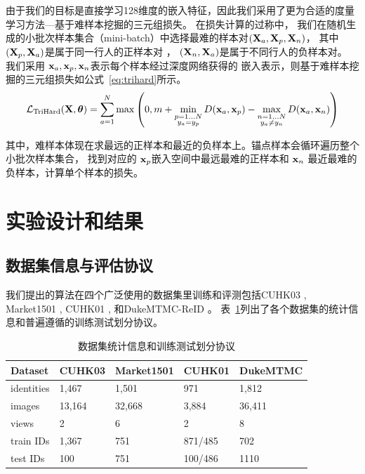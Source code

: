 由于我们的目标是直接学习128维度的嵌入特征，因此我们采用了更为合适的度量学习方法---基于难样本挖掘的三元组损失\cite{hermans2017defense}。
在损失计算的过称中，
我们在随机生成的小批次样本集合（mini-batch）中选择最难的样本对$({\mathbf{X}}_a, {\mathbf{X}}_p, {\mathbf{X}}_n)$，
其中 $({\mathbf{X}}_p, {\mathbf{X}}_a)$是属于同一行人的正样本对
， $({\mathbf{X}}_n, {\mathbf{X}}_a)$是属于不同行人的负样本对。
我们采用 ${\mathbf{x}}_a, {\mathbf{x}}_p, {\mathbf{x}}_n$表示每个样本经过深度网络获得的
嵌入表示，则基于难样本挖掘的三元组损失如公式~\ref{eq:trihard}所示。
\begin{equation}
	\mathcal{L}_{\textrm{TriHard}} ({\mathbf{X}}, {\boldsymbol{\theta}}) = \sum_{a=1}^{N} \max\left(
	0, m + \min_{\substack{
			p=1...N \\
			y_a = y_p}
	} D({\mathbf{x}}_a, {\mathbf{x}}_p)
	-  \max_{ \substack{
			n=1...N \\
			y_a \neq y_n }
	} D({\mathbf{x}}_a,{\mathbf{x}}_n)
	\right) \label{eq:trihard}
\end{equation}

其中，难样本体现在求最远的正样本和最近的负样本上。锚点样本会循环遍历整个小批次样本集合，
找到对应的 ${\mathbf{x}}_p$嵌入空间中最远最难的正样本和 ${\mathbf{x}}_n$ 最近最难的负样本，计算单个样本的损失。

\section{实验设计和结果}

\subsection{数据集信息与评估协议}

我们提出的算法在四个广泛使用的数据集里训练和评测包括CUHK03 \cite{li2014deepreid}, 
Market1501 \cite{zheng2015scalable},  CUHK01 \cite{li2013locally}, 
和DukeMTMC-ReID \cite{zheng2017unlabeled} \cite{ristani2016MTMC} 。
表~\ref{table:dataset}列出了各个数据集的统计信息和普遍遵循的训练测试划分协议。

\begin{table}
	\centering
	\caption{数据集统计信息和训练测试划分协议}
	\label{table:dataset}
	\begin{tabular}{lllll}
		\toprule
		Dataset    & CUHK03 & Market1501 & CUHK01  & DukeMTMC \\
		\midrule
		identities & 1,467  & 1,501      & 971     & 1,812     \\
		images     & 13,164 & 32,668     & 3,884   & 36,411    \\
		views      & 2      & 6          & 2       & 8           \\
		train IDs  & 1,367  & 751        & 871/485 & 702        \\
		test IDs   & 100    & 751        & 100/486 & 1110        \\
		\bottomrule
	\end{tabular}
\end{table}

